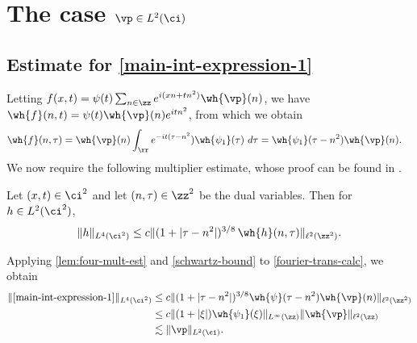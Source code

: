 \section{The case $\vp \in L^2(\ci)$}
\label{sec:s=0}
%
%
%
%
%
%
%
%
%
%
\subsection{Estimate for \eqref{main-int-expression-1}}
Letting $f(x,t) = \psi(t) \sum_{n \in \zz} e^{i(xn + tn^2)} 
\wh{\vp}(n)$, we have $\wh{f}(n,t) = \psi(t) \wh{\vp}(n) e^{itn^2}$,
from which we obtain
%
%
\begin{equation}
	\label{fourier-trans-calc}
	\begin{split}
		\wh{f}(n, \tau)
		& = \wh{\vp}(n) \int_\rr e^{-it( \tau - n^2}) 
		\wh{\psi_1}(\tau) \ d\tau
		= \wh{\psi_1}(\tau - n^2) \wh{\vp}(n).
	\end{split}
\end{equation}
%
%
We now require the following multiplier estimate, whose proof can be found in 
\cite{Bourgain:1993ju}. %
%
%
%
%
%
%
%
\begin{lemma}[Bourgain]
	\label{lem:four-mult-est}
	Let $(x, t) \in \ci^2$ and let $(n, \tau) \in \zz^2$ 
	be the dual variables. Then for $h \in L^2(\ci^2)$,
%
\begin{equation}
	\label{four-mult-est}
	\begin{split}
		\|h\|_{L^4(\ci^2)} \le c \|(1 + |\tau - 
		n^2|)^{3/8} \, \wh{h}(n, \tau) \|_{\ell^2(\zz^2)}.
	\end{split}
\end{equation}
%
%
\end{lemma}
%
%
%
%
%
%
%
Applying \cref{lem:four-mult-est} and \eqref{schwartz-bound} to
\eqref{fourier-trans-calc}, we obtain
%
%
\begin{equation}
	\label{main-int-est-part-1}
	\begin{split}
		\|\eqref{main-int-expression-1}\|_{L^4(\ci^2)} 
		& \le c  \|(1 + |\tau - 
		n^2|)^{3/8} \wh{\psi}(\tau - n^2) 		\wh{\vp}(n) \|_{\ell^2(\zz^2)}
		\\
		& \le c \|(1 + |\xi|)  \wh{\psi_1}(\xi)\|_{L^\infty(\zz)} 
		\|\wh{\vp} \|_{\ell^2(\zz)}
		\\
		& \lesssim \|\vp \|_{L^2(\ci)}.
	\end{split}
\end{equation}
%
%
%
%
%
%
%
%
